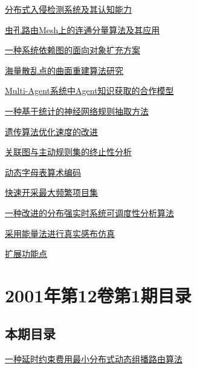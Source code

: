 \documentclass[a4paper]{article}
\begin{document}
\href{http://www.jos.org.cn/ch/reader/download_pdf.aspx?file_no=20010210&year_id=2001&quarter_id=2&falg=1}{分布式入侵检测系统及其认知能力}

\href{http://www.jos.org.cn/ch/reader/download_pdf.aspx?file_no=20010211&year_id=2001&quarter_id=2&falg=1}{虫孔路由Mesh上的连通分量算法及其应用}

\href{http://www.jos.org.cn/ch/reader/download_pdf.aspx?file_no=20010212&year_id=2001&quarter_id=2&falg=1}{一种系统依赖图的面向对象扩充方案}

\href{http://www.jos.org.cn/ch/reader/download_pdf.aspx?file_no=20010213&year_id=2001&quarter_id=2&falg=1}{海量散乱点的曲面重建算法研究}

\href{http://www.jos.org.cn/ch/reader/download_pdf.aspx?file_no=20010214&year_id=2001&quarter_id=2&falg=1}{Multi-Agent系统中Agent知识获取的合作模型}

\href{http://www.jos.org.cn/ch/reader/download_pdf.aspx?file_no=20010215&year_id=2001&quarter_id=2&falg=1}{一种基于统计的神经网络规则抽取方法}

\href{http://www.jos.org.cn/ch/reader/download_pdf.aspx?file_no=20010216&year_id=2001&quarter_id=2&falg=1}{遗传算法优化速度的改进}

\href{http://www.jos.org.cn/ch/reader/download_pdf.aspx?file_no=20010217&year_id=2001&quarter_id=2&falg=1}{关联图与主动规则集的终止性分析}

\href{http://www.jos.org.cn/ch/reader/download_pdf.aspx?file_no=20010218&year_id=2001&quarter_id=2&falg=1}{动态字母表算术编码}

\href{http://www.jos.org.cn/ch/reader/download_pdf.aspx?file_no=20010219&year_id=2001&quarter_id=2&falg=1}{快速开采最大频繁项目集}

\href{http://www.jos.org.cn/ch/reader/download_pdf.aspx?file_no=20010220&year_id=2001&quarter_id=2&falg=1}{一种改进的分布强实时系统可调度性分析算法}

\href{http://www.jos.org.cn/ch/reader/download_pdf.aspx?file_no=20010221&year_id=2001&quarter_id=2&falg=1}{采用能量法进行真实感布仿真}

\href{http://www.jos.org.cn/ch/reader/download_pdf.aspx?file_no=20010222&year_id=2001&quarter_id=2&falg=1}{扩展功能点}


\section{\textbf{2001年第12卷第1期目录}}
\subsection{本期目录}
\href{http://www.jos.org.cn/ch/reader/download_pdf.aspx?file_no=20010101&year_id=2001&quarter_id=1&falg=1}{一种延时约束费用最小分布式动态组播路由算法}
\end{document}
